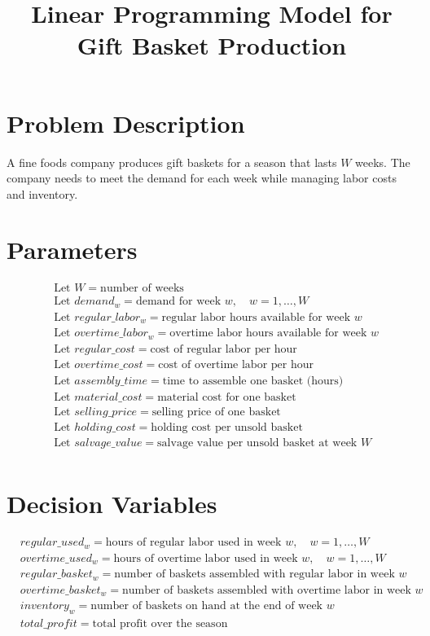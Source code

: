 \documentclass{article}
\begin{document}
\title{Linear Programming Model for Gift Basket Production}
\author{}
\date{}
\maketitle

\section*{Problem Description}
A fine foods company produces gift baskets for a season that lasts $W$ weeks. The company needs to meet the demand for each week while managing labor costs and inventory.

\section*{Parameters}
\begin{align*}
& \text{Let } W = \text{number of weeks} \\
& \text{Let } demand_w = \text{demand for week } w, \quad w = 1, \ldots, W \\
& \text{Let } regular\_labor_w = \text{regular labor hours available for week } w \\
& \text{Let } overtime\_labor_w = \text{overtime labor hours available for week } w \\
& \text{Let } regular\_cost = \text{cost of regular labor per hour} \\
& \text{Let } overtime\_cost = \text{cost of overtime labor per hour} \\
& \text{Let } assembly\_time = \text{time to assemble one basket (hours)} \\
& \text{Let } material\_cost = \text{material cost for one basket} \\
& \text{Let } selling\_price = \text{selling price of one basket} \\
& \text{Let } holding\_cost = \text{holding cost per unsold basket} \\
& \text{Let } salvage\_value = \text{salvage value per unsold basket at week } W \\
\end{align*}

\section*{Decision Variables}
\begin{align*}
& regular\_used_w = \text{hours of regular labor used in week } w, \quad w = 1, \ldots, W \\
& overtime\_used_w = \text{hours of overtime labor used in week } w, \quad w = 1, \ldots, W \\
& regular\_basket_w = \text{number of baskets assembled with regular labor in week } w \\
& overtime\_basket_w = \text{number of baskets assembled with overtime labor in week } w \\
& inventory_w = \text{number of baskets on hand at the end of week } w \\
& total\_profit = \text{total profit over the season} \\
\end{align*}
\end{document}

